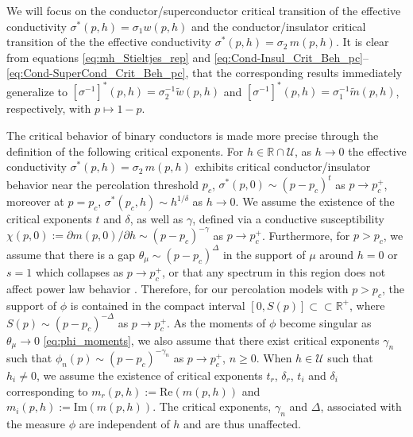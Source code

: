\documentclass[english,12pt,jmp,graphicx]{revtex4-1}
\begin{document}
We will focus on the conductor/superconductor critical transition of
the effective conductivity $\sigma^*(p,h)=\sigma_1w(p,h)$ and the
conductor/insulator critical transition of the the effective
conductivity $\sigma^*(p,h)=\sigma_2\,m(p,h)$. It is clear from equations
\eqref{eq:mh_Stieltjes_rep} and 
\eqref{eq:Cond-Insul_Crit_Beh_pc}--\eqref{eq:Cond-SuperCond_Crit_Beh_pc},
that the corresponding results immediately generalize to
$[\sigma^{-1}]^*(p,h)=\sigma_2^{-1}\tilde{w}(p,h)$ and
$[\sigma^{-1}]^*(p,h)=\sigma_1^{-1}\tilde{m}(p,h)$, respectively, with $p\mapsto1-p$. 

The critical behavior of binary conductors is made more precise
through the definition of the following critical exponents. For
$h\in\mathbb{R}\cap\mathcal{U}$, as $h\to0$ the effective conductivity
$\sigma^*(p,h)=\sigma_2\,m(p,h)$ exhibits critical conductor/insulator behavior
near the percolation threshold $p_c$, $\sigma^*(p,0)\sim(p-p_c)^t$ as
$p\to p_c^+$, moreover at $p=p_c$,
$\sigma^*(p_c,h)\sim h^{1/\delta}$ as $h\to0$. We assume the existence of the
critical exponents $t$ and $\delta$, as well as $\gamma$, defined via a
conductive susceptibility $\chi(p,0):=\partial m(p,0)/\partial h\sim(p-p_c)^{-\gamma}$ as
$p\to p_c^+$. Furthermore, for $p>p_c$, we assume that there is a gap 
$\theta_\mu\sim(p-p_c)^\Delta$ in the support of $\mu$ around $h=0$ or $s=1$ which
collapses as $p\to p_c^+$, or that any spectrum in this region does not
affect power law behavior \cite{Golden:PRL-3935}. Therefore, for our
percolation models with $p>p_c$, the support of $\phi$ is contained in
the compact interval $[0,S(p)]\subset\subset\mathbb{R}^+$, where $S(p)\sim(p-p_c)^{-\Delta}$ as
$p\to p_c^+$. As the moments of $\phi$ become singular as $\theta_\mu\to0$ 
\eqref{eq:phi_moments}, we also assume that there exist critical
exponents $\gamma_n$ such that $\phi_n(p)\sim(p-p_c)^{-\gamma_n}$ as $p\to p_c^+$,
$n\geq0$. When $h\in\mathcal{U}$ such that $h_i\neq0$, we
assume the existence of critical exponents $t_r$, $\delta_r$, $t_i$ and
$\delta_i$ corresponding to $m_r(p,h):=\text{Re}(m(p,h))$ and
$m_i(p,h):=\text{Im}(m(p,h))$. The critical exponents, $\gamma_n$ and $\Delta$,
associated with the measure $\phi$ are independent of $h$ and are thus
unaffected. 
\end{document}
